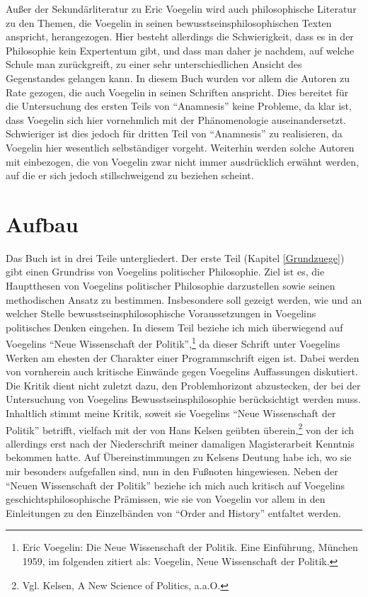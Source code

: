 Außer der Sekundärliteratur zu Eric Voegelin wird auch philosophische
Literatur zu den Themen, die Voegelin in seinen bewusstseinsphilosophischen
Texten anspricht, herangezogen. Hier besteht allerdings die Schwierigkeit,
dass es in der Philosophie kein Expertentum gibt, und dass man daher je
nachdem, auf welche Schule man zurückgreift, zu einer sehr unterschiedlichen
Ansicht des Gegenstandes gelangen kann.  In diesem Buch wurden vor allem die
Autoren zu Rate gezogen, die auch Voegelin in seinen Schriften anspricht. Dies
bereitet für die Untersuchung des ersten Teils von "`Anamnesis"' keine
Probleme, da klar ist, dass Voegelin sich hier vornehmlich mit der
Phänomenologie auseinandersetzt.  Schwieriger ist dies jedoch für dritten Teil
von "`Anamnesis"' zu realisieren, da Voegelin hier wesentlich selbständiger
vorgeht.  Weiterhin werden solche Autoren mit einbezogen, die von Voegelin zwar
nicht immer ausdrücklich erwähnt werden, auf die er sich jedoch
stillschweigend zu beziehen scheint.

\section{Aufbau}

Das Buch ist in drei Teile untergliedert. Der erste Teil (Kapitel
\ref{Grundzuege}) gibt einen Grundriss von Voegelins politischer Philosophie.
Ziel ist es, die Hauptthesen von Voegelins politischer Philosophie
darzustellen sowie seinen methodischen Ansatz zu bestimmen. Insbesondere soll
gezeigt werden, wie und an welcher Stelle bewusstseinsphilosophische
Voraussetzungen in Voegelins politisches Denken eingehen. In diesem Teil
beziehe ich mich überwiegend auf Voegelins "`Neue Wissenschaft der
Politik"',\footnote{Eric Voegelin: Die Neue Wissenschaft der Politik. Eine
  Einführung, München 1959, im folgenden zitiert als: Voegelin, Neue
  Wissenschaft der Politik.} da dieser Schrift unter Voegelins Werken am
ehesten der Charakter einer Programmschrift eigen ist. Dabei werden von
vornherein auch kritische Einwände gegen Voegelins Auf\/fassungen diskutiert.
Die Kritik dient nicht zuletzt dazu, den Problemhorizont abzustecken, der bei
der Untersuchung von Voegelins Bewusstseinsphilosophie berücksichtigt werden
muss. Inhaltlich stimmt meine Kritik, soweit sie Voegelins "`Neue Wissenschaft
der Politik"' betrifft, vielfach mit der von Hans Kelsen geübten
überein,\footnote{Vgl. Kelsen, A New Science of Politics, a.a.O.} von der ich
allerdings erst nach der Niederschrift meiner damaligen Magisterarbeit
Kenntnis bekommen hatte.  Auf Übereinstimmungen zu Kelsens Deutung habe ich,
wo sie mir besonders aufgefallen sind, nun in den Fußnoten hingewiesen. Neben
der "`Neuen Wissenschaft der Politik"' beziehe ich mich auch kritisch auf
Voegelins geschichtsphilosophische Prämissen, wie sie von Voegelin vor allem
in den Einleitungen zu den Einzelbänden von "`Order and History"' entfaltet
werden.

